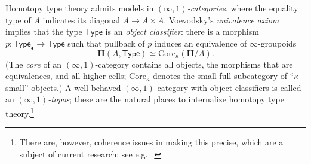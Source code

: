 \documentclass[copyright]{eptcs}
\makeatletter
\newcommand{\type}{\ensuremath{\mathsf{Type}}\xspace}
\renewcommand{\H}{\ensuremath{\mathbf{H}}\xspace}
\newcommand{\io}{\ensuremath{(\infty,1)}}
\def\jd#1{\@jd#1\ej}
\def\@jd#1|-#2\ej{\@@jd#1,,\;\vdash\;\left(#2\right)}
\def\@@jd#1,{\@ifmtarg{#1}{\let\next=\relax}{\left(#1\right)\let\next=\@@@jd}\next}
\def\@@@jd#1,{\@ifmtarg{#1}{\let\next=\relax}{,\,\left(#1\right)\let\next=\@@@jd}\next}
\makeatother
\begin{document}
Homotopy type theory admits models in \emph{\io-categories}, where the equality type of $A$ indicates its diagonal $A\to A\times A$.
%
%
Voevodsky's \emph{univalence axiom}~\cite{KLVunivalence} implies that the type \type is an
\emph{object classifier}: there is a morphism $p:{\type}_\bullet\to \type$ such that
pullback of $p$ induces an equivalence of $\infty$-groupoids
\begin{equation}
  \H(A,\type) \simeq \mathrm{Core}_\kappa(\H/A).\label{eq:objclassif}
\end{equation}
(The \emph{core} of an \io-category contains all objects, the morphisms that are equivalences, and all higher cells; $\mathrm{Core}_\kappa$ denotes the
small full subcategory of ``$\kappa$-small'' objects.)
%
%
A well-behaved \io-category with object classifiers is called an \emph{\io-topos}; these are the natural places to internalize homotopy type theory.\footnote{There are, however, coherence issues in making this precise, which are a subject of current research; see e.g.~\cite{ShulmanUnivalence,ShulmanUnivalence2}.}
\end{document}
